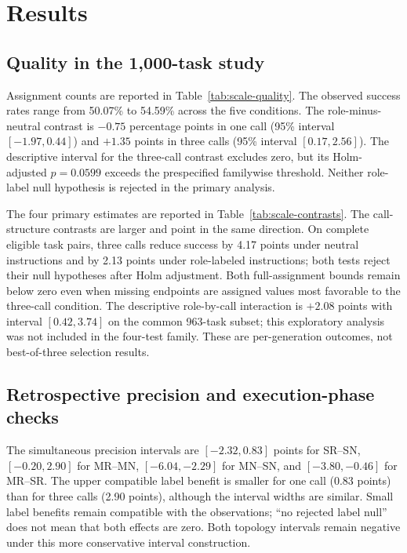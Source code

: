 \documentclass[pdflatex,sn-nature]{scientificreports}
\begin{document}
\section{Results}
\subsection{Quality in the 1,000-task study}
Assignment counts are reported in Table~\ref{tab:scale-quality}. The observed success rates range from 50.07\% to 54.59\% across the five conditions. The role-minus-neutral contrast is $-0.75$ percentage points in one call (95\% interval $[-1.97,0.44]$) and $+1.35$ points in three calls (95\% interval $[0.17,2.56]$). The descriptive interval for the three-call contrast excludes zero, but its Holm-adjusted $p=0.0599$ exceeds the prespecified familywise threshold. Neither role-label null hypothesis is rejected in the primary analysis.

The four primary estimates are reported in Table~\ref{tab:scale-contrasts}. The call-structure contrasts are larger and point in the same direction. On complete eligible task pairs, three calls reduce success by 4.17 points under neutral instructions and by 2.13 points under role-labeled instructions; both tests reject their null hypotheses after Holm adjustment. Both full-assignment bounds remain below zero even when missing endpoints are assigned values most favorable to the three-call condition. The descriptive role-by-call interaction is $+2.08$ points with interval $[0.42,3.74]$ on the common 963-task subset; this exploratory analysis was not included in the four-test family. These are per-generation outcomes, not best-of-three selection results.




\subsection{Retrospective precision and execution-phase checks}
The simultaneous precision intervals are $[-2.32,0.83]$ points for SR--SN, $[-0.20,2.90]$ for MR--MN, $[-6.04,-2.29]$ for MN--SN, and $[-3.80,-0.46]$ for MR--SR. The upper compatible label benefit is smaller for one call (0.83 points) than for three calls (2.90 points), although the interval widths are similar. Small label benefits remain compatible with the observations; ``no rejected label null'' does not mean that both effects are zero. Both topology intervals remain negative under this more conservative interval construction.
\end{document}
